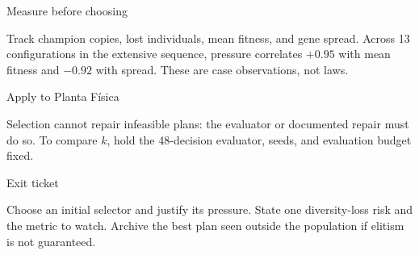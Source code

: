 \begin{frame}{Measure before choosing}

Track champion copies, lost individuals, mean fitness, and gene spread. Across 13 configurations in the extensive sequence, pressure correlates $+0.95$ with mean fitness and $-0.92$ with spread. These are case observations, not laws.

\end{frame}

\begin{frame}{Apply to Planta Física}

Selection cannot repair infeasible plans: the evaluator or documented repair must do so. To compare $k$, hold the 48-decision evaluator, seeds, and evaluation budget fixed.

\end{frame}

\begin{frame}{Exit ticket}

Choose an initial selector and justify its pressure. State one diversity-loss risk and the metric to watch. Archive the best plan seen outside the population if elitism is not guaranteed.

\end{frame}


